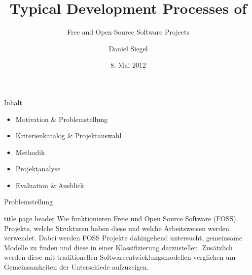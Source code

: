 \documentclass[11pt]{beamer}
\author{Daniel Siegel}
\title{Typical Development Processes of}%
\subtitle{Free and Open Source Software Projects}
\institute{Technische Universität München}
\date{8. Mai 2012}
\begin{document}
\begin{frame}[t,plain]
  \titlepage
\end{frame}

\begin{frame}[t]{Inhalt}
  \begin{itemize}
    \item Motivation \& Problemstellung
    \item Kriterienkatalog \& Projektauswahl
    \item Methodik
    \item Projektanalyse
    \item Evaluation \& Ausblick
  \end{itemize}
\end{frame}

\begin{frame}{Problemstellung}

\begin{beamercolorbox}[sep=1em]{title page header}
  Wie funktionieren Freie und Open Source Software (FOSS) Projekte, welche
  Strukturen haben diese und welche Arbeitsweisen werden verwendet. Dabei
  werden FOSS Projekte dahingehend untersucht, gemeinsame Modelle zu finden und
  diese in einer Klassifizierung darzustellen. Zusätzlich werden diese mit
  traditionellen Softwareentwicklungsmodellen verglichen um Gemeinsamkeiten
  der Unterschiede aufzuzeigen.
\end{beamercolorbox}
\end{frame}
\end{document}
